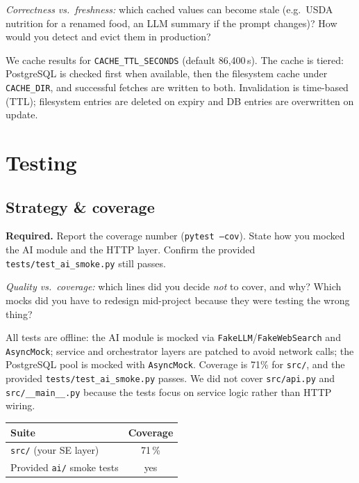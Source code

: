 \documentclass[11pt,a4paper]{article}
\begin{document}
\begin{probebox}
\textit{Correctness vs.\ freshness:} which cached values can become stale (e.g.\ USDA nutrition for a renamed food, an LLM summary if the prompt changes)? How would you detect and evict them in production?
\end{probebox}

We cache results for \texttt{CACHE\_TTL\_SECONDS} (default 86{,}400\,s). The cache is tiered: PostgreSQL is checked first when available, then the filesystem cache under \texttt{CACHE\_DIR}, and successful fetches are written to both. Invalidation is time-based (TTL); filesystem entries are deleted on expiry and DB entries are overwritten on update. 

\section{Testing}\label{sec:testing}

\subsection{Strategy \& coverage}

\begin{deliverbox}
\textbf{Required.} Report the coverage number (\texttt{pytest --cov}). State how you mocked the AI module and the HTTP layer. Confirm the provided \texttt{tests/test\_ai\_smoke.py} still passes.
\end{deliverbox}

\begin{probebox}
\textit{Quality vs.\ coverage:} which lines did you decide \emph{not} to cover, and why? Which mocks did you have to redesign mid-project because they were testing the wrong thing?
\end{probebox}

All tests are offline: the AI module is mocked via \texttt{FakeLLM}/\texttt{FakeWebSearch} and \texttt{AsyncMock}; service and orchestrator layers are patched to avoid network calls; the PostgreSQL pool is mocked with \texttt{AsyncMock}. Coverage is 71\% for \texttt{src/}, and the provided \texttt{tests/test\_ai\_smoke.py} passes. We did not cover \texttt{src/api.py} and \texttt{src/\_\_main\_\_.py} because the tests focus on service logic rather than HTTP wiring.

\begin{center}\small
\begin{tabular}{lc}
\toprule
\textbf{Suite} & \textbf{Coverage} \\
\midrule
\texttt{src/} (your SE layer) & 71\,\% \\
Provided \texttt{ai/} smoke tests & yes \\
\bottomrule
\end{tabular}
\end{center}
\end{document}
